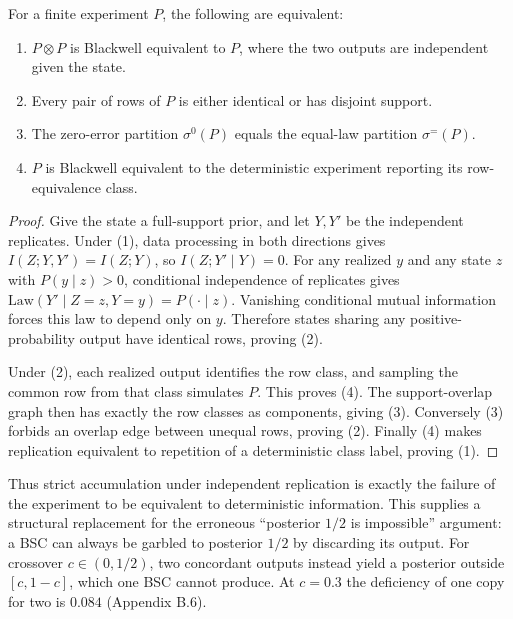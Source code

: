 
\begin{thmplain}

For a finite experiment \(P\), the following are equivalent:

\begin{enumerate}
\def\labelenumi{\arabic{enumi}.}
\tightlist
\item
  \(P\otimes P\) is Blackwell equivalent to \(P\), where the two outputs are independent given the state.
\item
  Every pair of rows of \(P\) is either identical or has disjoint support.
\item
  The zero-error partition \(\sigma^0(P)\) equals the equal-law partition \(\sigma^{=}(P)\).
\item
  \(P\) is Blackwell equivalent to the deterministic experiment reporting its row-equivalence class.
\end{enumerate}
\end{thmplain}

\begin{proof}

Give the state a full-support prior, and let \(Y,Y'\) be the independent replicates. Under (1), data processing in both directions gives \(I(Z;Y,Y')=I(Z;Y)\), so \(I(Z;Y'\mid Y)=0\). For any realized \(y\) and any state \(z\) with \(P(y\mid z)>0\), conditional independence of replicates gives \(\mathrm{Law}(Y'\mid Z=z,Y=y)=P(\cdot\mid z)\). Vanishing conditional mutual information forces this law to depend only on \(y\). Therefore states sharing any positive-probability output have identical rows, proving (2).

Under (2), each realized output identifies the row class, and sampling the common row from that class simulates \(P\). This proves (4). The support-overlap graph then has exactly the row classes as components, giving (3). Conversely (3) forbids an overlap edge between unequal rows, proving (2). Finally (4) makes replication equivalent to repetition of a deterministic class label, proving (1).
\end{proof}

Thus strict accumulation under independent replication is exactly the failure of the experiment to be equivalent to deterministic information. This supplies a structural replacement for the erroneous ``posterior \(1/2\) is impossible'' argument: a BSC can always be garbled to posterior \(1/2\) by discarding its output. For crossover \(c\in(0,1/2)\), two concordant outputs instead yield a posterior outside \([c,1-c]\), which one BSC cannot produce. At \(c=0.3\) the deficiency of one copy for two is \(0.084\) (Appendix B.6).

